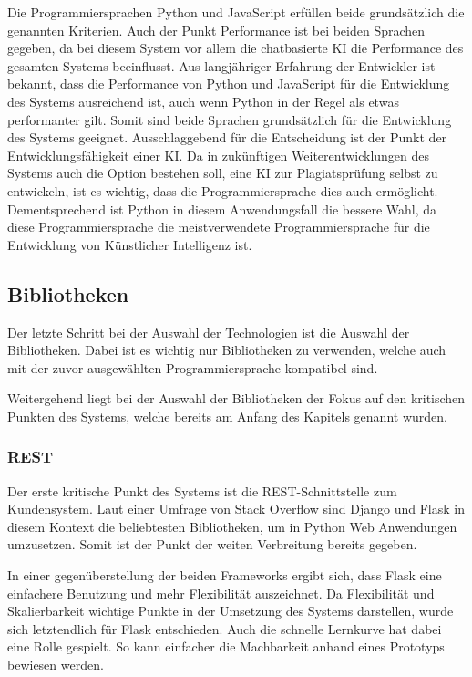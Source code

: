 Die Programmiersprachen Python und JavaScript erfüllen beide grundsätzlich die genannten Kriterien.
Auch der Punkt Performance ist bei beiden Sprachen gegeben, da bei diesem System
vor allem die chatbasierte KI die Performance des gesamten Systems beeinflusst.
Aus langjähriger Erfahrung der Entwickler ist bekannt, dass die
Performance von Python und JavaScript für die Entwicklung des Systems ausreichend ist,
auch wenn Python in der Regel als etwas performanter gilt.
Somit sind beide Sprachen grundsätzlich für die Entwicklung des Systems geeignet.
Ausschlaggebend für die Entscheidung ist der Punkt der Entwicklungsfähigkeit einer KI.
Da in zukünftigen Weiterentwicklungen des Systems auch die Option bestehen soll, eine KI zur Plagiatsprüfung selbst zu entwickeln,
ist es wichtig, dass die Programmiersprache dies auch ermöglicht.
Dementsprechend ist Python in diesem Anwendungsfall die bessere Wahl, da diese Programmiersprache
die meistverwendete Programmiersprache für die Entwicklung von Künstlicher Intelligenz ist.

\subsection{Bibliotheken}\label{subsec:bibliotheken}
Der letzte Schritt bei der Auswahl der Technologien ist die Auswahl der Bibliotheken.
Dabei ist es wichtig nur Bibliotheken zu verwenden, welche auch mit der zuvor ausgewählten Programmiersprache kompatibel sind.

Weitergehend liegt bei der Auswahl der Bibliotheken der Fokus auf den kritischen
Punkten des Systems, welche bereits am Anfang des Kapitels genannt wurden.

\subsubsection{REST}\label{subsubsec:rest}
Der erste kritische Punkt des Systems ist die REST-Schnittstelle zum Kundensystem.
Laut einer Umfrage von Stack Overflow sind Django und Flask in diesem Kontext die beliebtesten
Bibliotheken, um in Python Web Anwendungen umzusetzen\autocite{webframeworks}.
Somit ist der Punkt der weiten Verbreitung bereits gegeben.

In einer gegenüberstellung der beiden Frameworks ergibt sich, dass Flask eine einfachere
Benutzung und mehr Flexibilität auszeichnet\autocite{flaskdjango}.
Da Flexibilität und Skalierbarkeit wichtige Punkte in der Umsetzung des Systems darstellen,
wurde sich letztendlich für Flask entschieden.
Auch die schnelle Lernkurve hat dabei eine Rolle gespielt.
So kann einfacher die Machbarkeit anhand eines Prototyps bewiesen werden.

